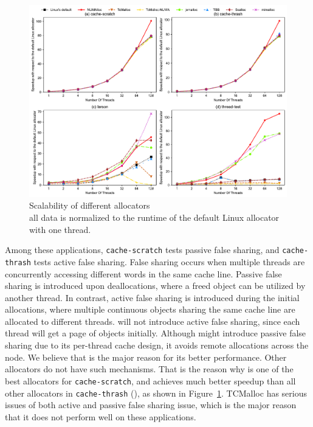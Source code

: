  
\begin{figure}[!th]
    \centering
    \includegraphics[width=\textwidth]{figure/sythentic-scalobility-new.pdf}
    \caption{Scalability of different allocators\\ all data is normalized to the runtime of the default Linux allocator with one thread.}
    \label{sythentic-scalability}
\end{figure}

Among these applications, \texttt{cache-scratch} tests passive false sharing, and \texttt{cache-thrash} tests active false sharing. False sharing occurs when multiple threads are concurrently accessing different words in the same cache line. 
Passive false sharing is introduced upon deallocations, where a freed object can be utilized by another thread. In contrast, active false sharing is introduced during the initial allocations, where multiple continuous objects sharing the same cache line are allocated to different threads. 
 \NM{} will not introduce active false sharing, since each thread will get a page of objects initially. Although \NM{} might introduce passive false sharing due to its per-thread cache design, it avoids remote allocations across the node. 
 We believe that is the major reason for its better performance. Other allocators do not have such mechanisms. 
 That is the reason why \NM{} is one of the best allocators for \texttt{cache-scratch}, and achieves much better speedup than all other allocators in \texttt{cache-thrash} (), as shown in Figure~\ref{sythentic-scalability}. TCMalloc has serious issues of both active and passive false sharing issue, which is the major reason that it does not perform well on these applications.  
 
